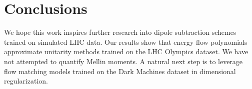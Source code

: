\section{Conclusions}\label{sec:conclusions}

We hope this work inspires further research into dipole subtraction
schemes trained on simulated LHC data. Our results show that energy flow
polynomials approximate unitarity methods trained on the LHC Olympics
dataset. We have not attempted to quantify Mellin moments. A natural
next step is to leverage flow matching models trained on the Dark
Machines dataset in dimensional regularization.


